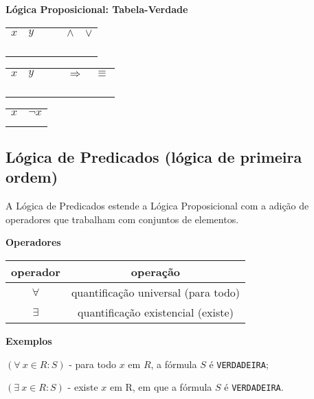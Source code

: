     \textbf{Lógica Proposicional: Tabela-Verdade}

\begin{longtable}[]{@{}llllll@{}}
\(x\) & \(y\) & & & \(\land\) & \(\lor\)\tabularnewline
\emph{\texttt{\F}} & \emph{\texttt{\F}} & & & \texttt{\F} &
\texttt{\F}\tabularnewline
\emph{\texttt{\F}} & \emph{\texttt{\T}} & & & \texttt{\F} &
\texttt{\T}\tabularnewline
\emph{\texttt{\T}} & \emph{\texttt{\F}} & & & \texttt{\F} &
\texttt{\T}\tabularnewline
\emph{\texttt{\T}} & \emph{\texttt{\T}} & & & \texttt{\T} &
\texttt{\T}\tabularnewline
\end{longtable}

    \begin{longtable}[]{@{}llllll@{}}
\(x\) & \(y\) & & & \(\Rightarrow\) & \(\equiv\)\tabularnewline
\emph{\texttt{\F}} & \emph{\texttt{\F}} & & & \texttt{\T} &
\texttt{\T}\tabularnewline
\emph{\texttt{\F}} & \emph{\texttt{\T}} & & & \texttt{\T} &
\texttt{\F}\tabularnewline
\emph{\texttt{\T}} & \emph{\texttt{\F}} & & & \texttt{\F} &
\texttt{\F}\tabularnewline
\emph{\texttt{\T}} & \emph{\texttt{\T}} & & & \texttt{\T} &
\texttt{\T}\tabularnewline
\end{longtable}

    \begin{longtable}[]{@{}cc@{}}
\(x\) & \(\lnot x\)\tabularnewline
\texttt{\F} & \texttt{\T}\tabularnewline
\texttt{\T} & \texttt{\F}\tabularnewline
\end{longtable}

\subsection*{Lógica de Predicados (lógica de primeira
ordem)}

A Lógica de Predicados estende a Lógica Proposicional com a adição de
operadores que trabalham com conjuntos de elementos.

\textbf{Operadores}

\begin{longtable}[]{@{}cc@{}}
operador & operação\tabularnewline
\endhead
\(\forall\) & quantificação universal (para todo)\tabularnewline
\(\exists\) & quantificação existencial (existe)\tabularnewline
\end{longtable}

    \textbf{Exemplos}

\((\forall\ x \in R : S)\) - para todo \(x\) em \(R\), a fórmula \(S\) é
\texttt{VERDADEIRA};

\((\exists \ x \in R : S)\) - existe \(x\) em R, em que a fórmula \(S\)
é \texttt{VERDADEIRA}.


